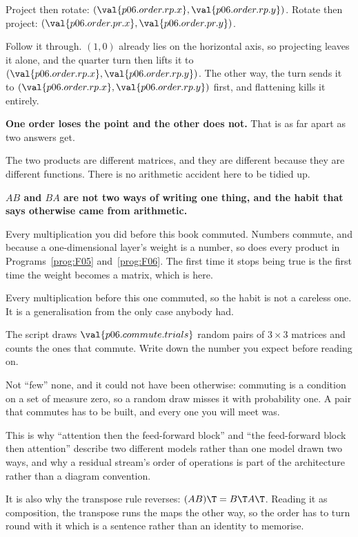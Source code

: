 \begin{fr}
\begin{ansblock}
Project then rotate: $(\val{p06.order.rp.x}, \val{p06.order.rp.y})$.
Rotate then project: $(\val{p06.order.pr.x}, \val{p06.order.pr.y})$.
\end{ansblock}

Follow it through. $(1, 0)$ already lies on the horizontal axis, so projecting
leaves it alone, and the quarter turn then lifts it to
$(\val{p06.order.rp.x}, \val{p06.order.rp.y})$. The other way, the turn sends
it to $(\val{p06.order.rp.x}, \val{p06.order.rp.y})$ first, and flattening kills
it entirely.

\textbf{One order loses the point and the other does not.} That is as far apart
as two answers get.
\end{fr}

\begin{fr}

The two products are different matrices, and they are different because they
are different functions. There is no arithmetic accident here to be tidied up.

\begin{trapbox}
\textbf{$AB$ and $BA$ are not two ways of writing one thing, and the habit that
says otherwise came from arithmetic.}

Every multiplication you did before this book commuted. Numbers commute, and
because a one-dimensional layer's weight is a number, so does every product in
Programs~\ref{prog:F05} and~\ref{prog:F06}. The first time it stops being true
is the first time the weight becomes a matrix, which is here.

Every multiplication before this one commuted, so the habit is not a careless
one. It is a generalisation from the only case anybody had.
\end{trapbox}

The script draws $\val{p06.commute.trials}$ random pairs of $3 \times 3$
matrices and counts the ones that commute. Write down the number you expect
before reading on.
\dotline
\nextframe
\end{fr}

\begin{fr}
Not \enquote{few} \dash{} none, and it could not have been otherwise:
commuting is a condition on a set of measure zero, so a random draw misses it
with probability one. A pair that commutes has to be built, and every one you
will meet was.

\begin{aibox}
This is why \enquote{attention then the feed-forward block} and
\enquote{the feed-forward block then attention} describe two different models
rather than one model drawn two ways, and why a residual stream's order of
operations is part of the architecture rather than a diagram convention.

It is also why the transpose rule reverses: $(AB)\T = B\T A\T$. Reading it as
composition, the transpose runs the maps the other way, so the order has to
turn round with it \dash{} which is a sentence rather than an identity to
memorise.
\end{aibox}
\end{fr}


